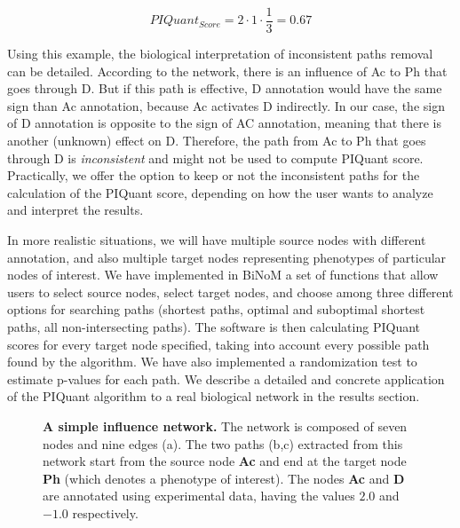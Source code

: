 \documentclass[10pt]{bmc_article}
\newenvironment{bmcformat}{\baselineskip20pt\sloppy\setboolean{publ}{false}}{\baselineskip20pt\sloppy}
\begin{document}
\begin{bmcformat}
$$
 PIQuant_{Score} = 2 \cdot 1 \cdot \frac{1}{3} = 0.67
$$

Using this example, the biological interpretation of inconsistent paths removal
can be detailed. According to the network, there is an influence of Ac to Ph
that goes through D. But if this path
is effective, D annotation would have the same sign than Ac annotation, because
Ac activates D indirectly. In our case, the sign of D annotation is opposite to
the sign of AC annotation, meaning that there is another (unknown) effect on D.
Therefore, the path from Ac to Ph that goes through D is \textit{inconsistent} and
might not be used to compute PIQuant score. Practically, we offer the option to
keep or not the inconsistent paths for the calculation of the PIQuant score,
depending on how the user wants to analyze and interpret the results.

In more realistic situations, we will have multiple source nodes with different
 annotation, and also multiple target nodes representing phenotypes of
particular nodes of interest. We have implemented in BiNoM a set of functions
that allow users to select source nodes, select target nodes, and choose among
three different options for searching paths (shortest paths, optimal and
suboptimal shortest paths, all non-intersecting paths). The software is then
calculating PIQuant scores for every target node specified, taking into account
every possible path found by the algorithm. We have also implemented a
randomization test to estimate p-values for each path. We describe a detailed
and concrete application of the PIQuant algorithm to a real biological network
in the results section.

\begin{figure}[h]
 \caption{\label{piquantnetworks}  \textbf{A simple influence network.} The 
network is composed of seven nodes and nine edges (a). The two paths (b,c)
extracted from this network start from the source node \textbf{Ac} and end at
the target node \textbf{Ph} (which denotes a phenotype of interest). The nodes
\textbf{Ac} and \textbf{D} are annotated using experimental data, having the
values $2.0$ and $-1.0$ respectively.}
\end{figure}


\end{bmcformat}
\end{document}
